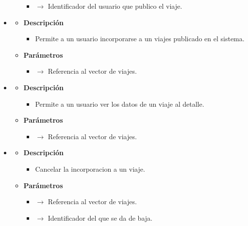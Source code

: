 \begin{itemize}
\begin{itemize}
\begin{itemize}
            \item {} $\rightarrow$ Identificador del usuario que publico el viaje.
		\end{itemize}
	\end{itemize}
    \item {}
    \begin{itemize}
        \item \textbf{Descripción}
        \begin{itemize}
			\item  Permite a un usuario incorporarse a un viajes publicado en el sistema.
		\end{itemize}
		\item \textbf{Parámetros}
		\begin{itemize}
			\item {}  $\rightarrow$ Referencia al vector de viajes.
		\end{itemize}
	\end{itemize}
    \newpage
    \item{}
    \begin{itemize}
        \item \textbf{Descripción}
        \begin{itemize}
			\item  Permite a un usuario ver los datos de un viaje al detalle.
		\end{itemize}
		\item \textbf{Parámetros}
		\begin{itemize}
			\item {}  $\rightarrow$ Referencia al vector de viajes.
		\end{itemize}
	\end{itemize}
    \item{}
    \begin{itemize}
        \item \textbf{Descripción}
        \begin{itemize}
			\item  Cancelar la incorporacion a un viaje.
		\end{itemize}
		\item \textbf{Parámetros}
		\begin{itemize}
			\item {}  $\rightarrow$ Referencia al vector de viajes.
            \item {} $\rightarrow$ Identificador del que se da de baja.

\end{itemize}
\end{itemize}
\end{itemize}
